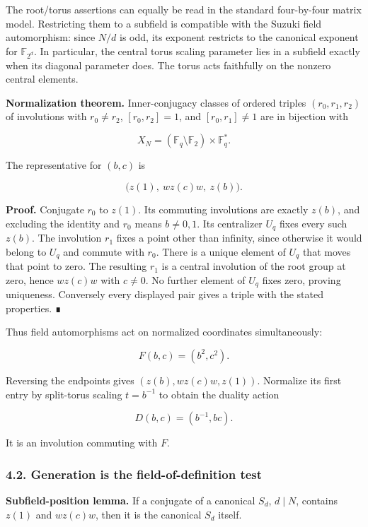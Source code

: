 \documentclass[
  11pt,
  a4paper,
]{article}
\begin{document}
The root/torus assertions can equally be read in the standard
four-by-four matrix model. Restricting them to a subfield is compatible
with the Suzuki field automorphism: since \(N/d\) is odd, its exponent
restricts to the canonical exponent for \(\mathbb F_{2^d}\). In
particular, the central torus scaling parameter lies in a subfield
exactly when its diagonal parameter does. The torus acts faithfully on
the nonzero central elements.

\textbf{Normalization theorem.} Inner-conjugacy classes of ordered
triples \((r_0,r_1,r_2)\) of involutions with \(r_0\ne r_2\),
\([r_0,r_2]=1\), and \([r_0,r_1]\ne1\) are in bijection with

\[X_N=(\mathbb F_q\setminus\mathbb F_2)\times\mathbb F_q^*.\]

The representative for \((b,c)\) is

\[\bigl(z(1),\ wz(c)w,\ z(b)\bigr).\]

\textbf{Proof.} Conjugate \(r_0\) to \(z(1)\). Its commuting involutions
are exactly \(z(b)\), and excluding the identity and \(r_0\) means
\(b\ne0,1\). Its centralizer \(U_q\) fixes every such \(z(b)\). The
involution \(r_1\) fixes a point other than infinity, since otherwise it
would belong to \(U_q\) and commute with \(r_0\). There is a unique
element of \(U_q\) that moves that point to zero. The resulting \(r_1\)
is a central involution of the root group at zero, hence \(wz(c)w\) with
\(c\ne0\). No further element of \(U_q\) fixes zero, proving uniqueness.
Conversely every displayed pair gives a triple with the stated
properties. ∎

Thus field automorphisms act on normalized coordinates simultaneously:

\[F(b,c)=(b^2,c^2).\]

Reversing the endpoints gives \((z(b),wz(c)w,z(1))\). Normalize its
first entry by split-torus scaling \(t=b^{-1}\) to obtain the duality
action

\[D(b,c)=(b^{-1},bc).\]

It is an involution commuting with \(F\).

\subsubsection{4.2. Generation is the field-of-definition
test}\label{generation-is-the-field-of-definition-test}

\textbf{Subfield-position lemma.} If a conjugate of a canonical \(S_d\),
\(d\mid N\), contains \(z(1)\) and \(wz(c)w\), then it is the canonical
\(S_d\) itself.
\end{document}
